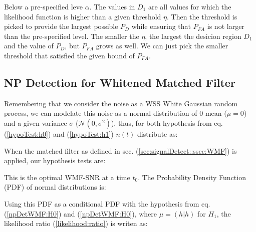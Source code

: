 \newp Below a pre-specified leve $\alpha$. The values in $D_1$ are all values for which the likelihood function is higher than a given threshold $\eta$. Then the threshold is picked to provide the largest possible $P_D$ while ensuring that $P_{FA}$ is not larger than the pre-specified level. The smaller the $\eta$, the largest the desicion region $D_1$ and the value of $P_D$, but $P_{FA}$ grows as well. We can just pick the smaller threshold that satisfied the given bound of $P_{FA}$.

\subsection{NP Detection for Whitened Matched Filter}

\newp Remembering that we consider the noise as a WSS White Gaussian random process, we can modelate this noise as a normal distribution of 0 mean ($\mu = 0$) and a given variance $\sigma$ ($\mathcal{N}(0, \sigma^{2})$), thus,  for both hypothesis from eq. (\ref{hypoTest:h0}) and (\ref{hypoTest:h1}) $n(t)$ distribute as:


\newp When the matched filter as defined in sec. (\ref{sec:signalDetect::ssec:WMF}) is applied, our hypothesis tests are:


\newp This is the optimal WMF-SNR at a time $t_0$. The Probability Density Function (PDF) of normal distributions is:


\newp Using this PDF as a conditional PDF with the hypothesis from eq. (\ref{npDetWMF:H0}) and (\ref{npDetWMF:H0}), where $\mu = (h|h)$ for $H_1$, the likelihood ratio (\ref{likelihood:ratio}) is writen as: 


